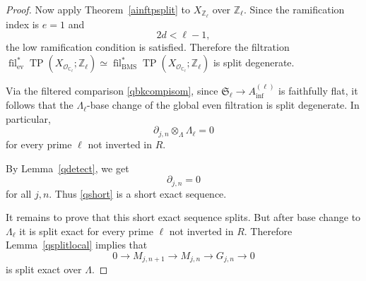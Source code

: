 \documentclass[11pt]{amsart}
\numberwithin{equation}{section}
\newcommand{\Z}{\mathbb{Z}}
\newcommand{\sO}{\mathcal{O}}
\newcommand{\ev}{\operatorname{ev}}
\newcommand{\mf}{\mathfrak}
\newcommand{\fil}{{\operatorname{fil}}}
\newcommand{\BMS}{\mathrm{BMS}}
\newcommand{\mS}{\mf{S}}
\numberwithin{equation}{section}
\newcommand{\Ainf}{A_{\operatorname{inf}}}
\newcommand{\TP}{\operatorname{TP}}
\begin{document}
\begin{proof}
Now apply Theorem~\ref{ainftpsplit} to
$X_{\Z_\ell}$ over $\Z_\ell$. Since the ramification index is $e=1$ and
\[
  2d<\ell-1,
\]
the low ramification condition is satisfied. Therefore the filtration $\fil_{\ev}^{*}\TP(X_{\sO_{\mathbb{C}_\ell}};\Z_\ell)\simeq \fil_{\BMS}^{*}\TP(X_{\sO_{\mathbb{C}_\ell}};\Z_\ell)$ is split degenerate.

Via the filtered comparison \eqref{qbkcompisom}, since $\mS_\ell \to \Ainf^{(\ell)}$ is faithfully flat, it follows
that the $\Lambda_\ell$-base change of the global even filtration is split
degenerate. In particular,
\[
  \partial_{j,n}\otimes_{\Lambda}\Lambda_\ell=0
\]
for every prime $\ell$ not inverted in $R$.

By Lemma~\ref{qdetect}, we get
\[
  \partial_{j,n}=0
\]
for all $j,n$. Thus \eqref{qshort} is a short
exact sequence.

It remains to prove that this short exact sequence splits. But after base
change to $\Lambda_\ell$ it is split exact for every prime $\ell$ not inverted
in $R$. Therefore
Lemma~\ref{qsplitlocal} implies that
\[
  0
  \to
  M_{j,n+1}
  \to
  M_{j,n}
  \to
  G_{j,n}
  \to
  0
\]
is split exact over $\Lambda$.
\end{proof}





\end{document}
